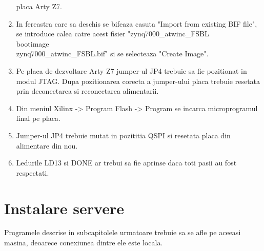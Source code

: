 \begin{enumerate}
    placa Arty Z7.
    \item In fereastra care sa deschis se bifeaza casuta "Import from existing BIF file", se introduce calea catre acest fisier 
    "zynq7000\_atwinc\_FSBL\\bootimage\\zynq7000\_atwinc\_FSBL.bif" si se selecteaza "Create Image".
    \item Pe placa de dezvoltare Arty Z7 jumper-ul JP4 trebuie sa fie pozitionat in modul JTAG. Dupa pozitionarea corecta a jumper-ului placa trebuie resetata prin deconectarea 
    si reconectarea alimentarii.
    \item Din meniul Xilinx -> Program Flash -> Program se incarca microprogramul final pe placa.
    \item Jumper-ul JP4 trebuie mutat in pozititia QSPI si resetata placa din alimentare din nou.
    \item Ledurile LD13 si DONE ar trebui sa fie aprinse daca toti pasii au fost respectati.
\end{enumerate}

\section{Instalare servere}\label{sec:iu_instalare_servere}
Programele descrise in subcapitolele urmatoare trebuie sa se afle pe aceeasi masina, deoarece conexiunea dintre ele este locala.
